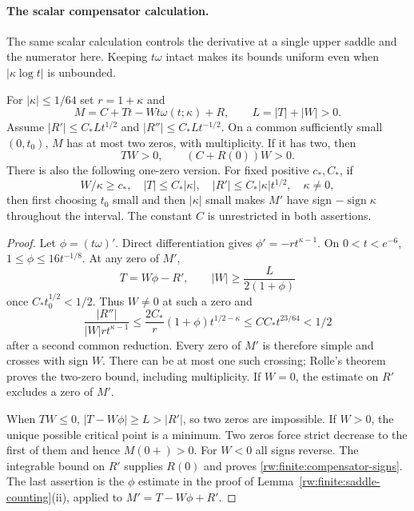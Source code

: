 \paragraph{The scalar compensator calculation.}
The same scalar calculation controls the derivative at a single upper
saddle and the numerator here. Keeping $t\omega$ intact makes its
bounds uniform even when $|\kappa\log t|$ is unbounded.

\begin{lemma}\label{rw:finite:compensator-calculus}
For $|\kappa|\le1/64$ set $r=1+\kappa$ and
\[
 M=C+Tt-Wt\omega(t;\kappa)+R,\qquad L=|T|+|W|>0.
\]
Assume $|R'|\le C_*Lt^{1/2}$ and
$|R''|\le C_*Lt^{-1/2}$. On a common sufficiently small
$(0,t_0)$, $M$ has at most two zeros, with multiplicity.
If it has two, then
\begin{equation}\label{rw:finite:compensator-signs}
 TW>0,\qquad (C+R(0))W>0.
\end{equation}
There is also the following one-zero version. For fixed positive
$c_*,C_*$, if
\[
 W/\kappa\ge c_*,\quad |T|\le C_*|\kappa|,\quad
 |R'|\le C_*|\kappa|t^{1/2},\quad \kappa\ne0,
\]
then first choosing $t_0$ small and then $|\kappa|$ small makes
$M'$ have sign $-\operatorname{sign}\kappa$ throughout the interval.
The constant $C$ is unrestricted in both assertions.
\end{lemma}

\begin{proof}
Let $\phi=(t\omega)'$. Direct differentiation gives
$\phi'=-rt^{\kappa-1}$. On $0<t<e^{-6}$,
$1\le\phi\le16t^{-1/8}$. At any zero of $M'$,
\[
 T=W\phi-R',\qquad
 |W|\ge\frac{L}{2(1+\phi)}
\]
once $C_*t_0^{1/2}<1/2$. Thus $W\ne0$ at such a zero and
\[
 \frac{|R''|}{|W|rt^{\kappa-1}}
 \le \frac{2C_*}{r}(1+\phi)t^{1/2-\kappa}
 \le C C_*t^{23/64}<1/2
\]
after a second common reduction. Every zero of $M'$ is therefore
simple and crosses with sign $W$. There can be at most one such
crossing; Rolle's theorem proves the two-zero bound, including
multiplicity. If $W=0$, the estimate on $R'$ excludes a zero of $M'$.

When $TW\le0$, $|T-W\phi|\ge L>|R'|$, so two zeros are impossible.
If $W>0$, the unique possible critical point is a minimum. Two zeros
force strict decrease to the first of them and hence $M(0+)>0$.
For $W<0$ all signs reverse. The integrable bound on $R'$ supplies
$R(0)$ and proves \eqref{rw:finite:compensator-signs}.
The last assertion is the $\phi$ estimate in the proof of
Lemma~\ref{rw:finite:saddle-counting}\textup{(ii)}, applied to
$M'=T-W\phi+R'$.
\end{proof}

